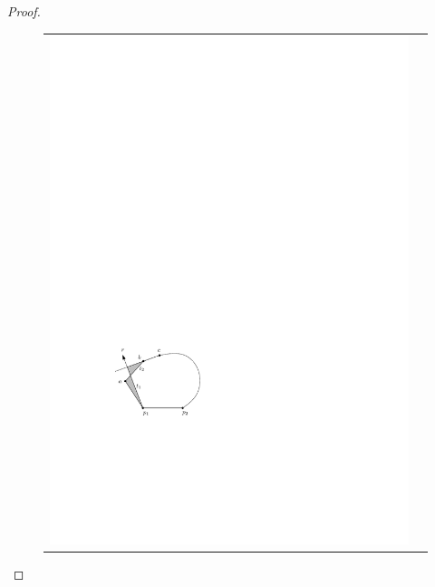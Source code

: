 \documentclass[preprint, 12pt]{elsarticle}
\begin{document}
\begin{proof}
\begin{figure}[htbp]
\begin{center}
\begin{tabular}{cc}
      \includegraphics{pics/inductive2} \\

\end{tabular}
\end{center}
\end{figure}
\end{proof}
\end{document}
